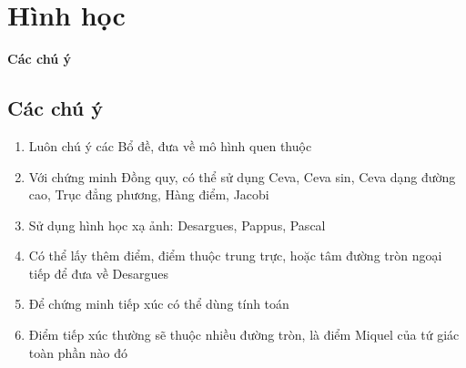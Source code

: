 \documentclass[12pt,a4paper]{article}
\theoremstyle{definition}
\theoremstyle{remark}
\let\stdsection\section
\renewcommand\section{\newpage\stdsection}
\begin{document}
\section{Hình học}
\textbf{Các chú ý}
\subsection{Các chú ý}
\begin{enumerate}
  \item Luôn chú ý các Bổ đề, đưa về mô hình quen thuộc
  \item Với chứng minh Đồng quy, có thể sử dụng Ceva, Ceva sin, Ceva dạng đường cao, Trục đẳng phương, Hàng điểm, Jacobi
  \item Sử dụng hình học xạ ảnh: Desargues, Pappus, Pascal
  \item Có thể lấy thêm điểm, điểm thuộc trung trực, hoặc tâm đường tròn ngoại tiếp để đưa về Desargues
  \item Để chứng minh tiếp xúc có thể dùng tính toán
  \item Điểm tiếp xúc thường sẽ thuộc nhiều đường tròn, là điểm Miquel của tứ giác toàn phần nào đó
\end{enumerate}
\end{document}
